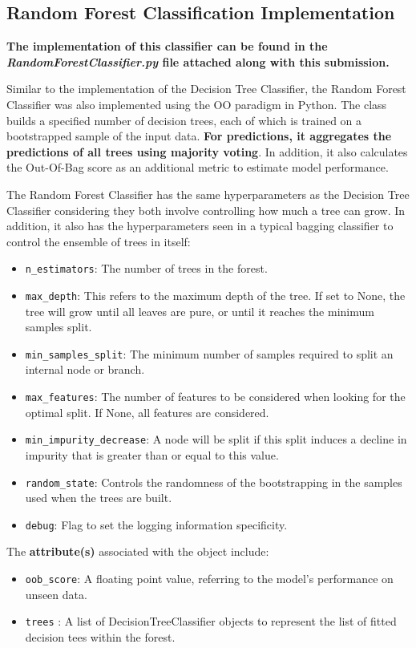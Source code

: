 \begin{appendices}
  \subsection{Random Forest Classification Implementation} \label{app:sec:rf_implementation}

  \textbf{The implementation of this classifier can be found in the \textit{RandomForestClassifier.py} file attached along with this submission.}

  Similar to the implementation of the Decision Tree Classifier, the Random Forest Classifier was also implemented using the OO paradigm in Python. The class builds a specified number of decision trees, each of which is trained on a bootstrapped sample of the input data.
  \textbf{For predictions, it aggregates the predictions of all trees using majority voting}.
  In addition, it also calculates the Out-Of-Bag score as an additional metric to estimate model performance.

  The Random Forest Classifier has the same hyperparameters as the Decision Tree Classifier considering they both involve controlling how much a tree can grow. In addition, it also has the hyperparameters seen in a typical bagging classifier to control the ensemble of trees in itself:
  \begin{itemize}
    \item \texttt{n\_estimators}: The number of trees in the forest.
    \item \texttt{max\_depth}: This refers to the maximum depth of the tree. If set to None, the tree will grow until all leaves are pure, or until it reaches the minimum samples split.
    \item \texttt{min\_samples\_split}: The minimum number of samples required to split an internal node or branch.
    \item \texttt{max\_features}: The number of features to be considered when looking for the optimal split. If None, all features are considered.
    \item \texttt{min\_impurity\_decrease}: A node will be split if this split induces a decline in impurity that is greater than or equal to this value.
    \item \texttt{random\_state}: Controls the randomness of the bootstrapping in the samples used when the trees are built.
    \item \texttt{debug}: Flag to set the logging information specificity.
  \end{itemize}

  The \textbf{attribute(s)} associated with the object include:
  \begin{itemize}
    \item \texttt{oob\_score}: A floating point value, referring to the model's performance on unseen data.
    \item \texttt{trees} : A list of DecisionTreeClassifier objects to represent the list of fitted decision tees within the forest.
  \end{itemize}


\end{appendices}
